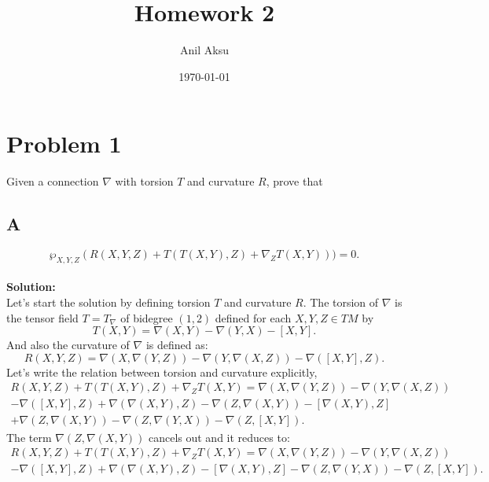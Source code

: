 \documentclass[11pt]{amsart}
\title{Homework 2}
\author{Anil Aksu}
\date{\today}
\begin{document}
\maketitle

\section{Problem 1 }

Given a connection $\nabla$ with torsion $T$ and curvature $R$, prove that
\\
\subsection*{A}
\begin{equation*}
\wp_{X,Y,Z} \left ( R(X,Y,Z)+T(T(X,Y),Z)+\nabla_{Z}T(X,Y) \right ))=0.
\end{equation*}
\\
\textbf{Solution:}\\
Let's start the solution by defining torsion $T$ and curvature $R$. The torsion of $\nabla$ is the tensor field $T=T_{\nabla}$ of bidegree $(1,2)$ defined for each $X,Y,Z\in TM$ by 
\begin{equation*}
T(X,Y)=\nabla(X,Y)-\nabla(Y,X)-\left [ X,Y \right ].
\end{equation*} 
And also the curvature of $\nabla$ is defined as:
\begin{equation*}
R(X,Y,Z)=\nabla(X,\nabla(Y,Z))-\nabla(Y,\nabla(X,Z))-\nabla(\left [ X,Y \right ],Z).
\end{equation*} 
Let's write the relation between torsion and curvature explicitly,
\begin{equation}
\label{eq:1}
\begin{split}
R(X,Y,Z)+T(T(X,Y),Z)+\nabla_{Z}T(X,Y)=\nabla(X,\nabla(Y,Z))-\nabla(Y,\nabla(X,Z))
\\
-\nabla(\left [ X,Y \right ],Z)+\nabla(\nabla(X,Y),Z)-\nabla(Z,\nabla(X,Y))-\left [ \nabla(X,Y),Z \right ]
\\
+\nabla(Z,\nabla(X,Y))-\nabla(Z,\nabla(Y,X))-\nabla(Z,\left [ X,Y \right ]).
\end{split}
\end{equation}
The term $\nabla(Z,\nabla(X,Y))$ cancels out and it reduces to:
\begin{equation}
\label{eq:2}
\begin{split}
R(X,Y,Z)+T(T(X,Y),Z)+\nabla_{Z}T(X,Y)=\nabla(X,\nabla(Y,Z))-\nabla(Y,\nabla(X,Z))
\\
-\nabla(\left [ X,Y \right ],Z)+\nabla(\nabla(X,Y),Z)-\left [ \nabla(X,Y),Z \right ]
-\nabla(Z,\nabla(Y,X))-\nabla(Z,\left [ X,Y \right ]).
\end{split}
\end{equation}
\end{document}
